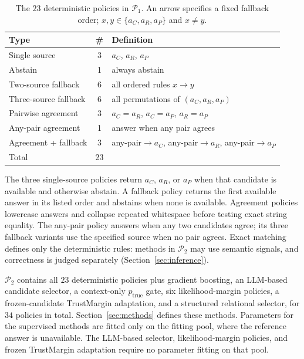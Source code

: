 \documentclass[sigconf]{acmart}
\newcommand{\ac}{a_C}
\newcommand{\ar}{a_R}
\newcommand{\ap}{a_P}
\begin{document}
\begin{table}[t]
\centering
\footnotesize
\caption{The $23$ deterministic policies in $\mathcal{P}_1$.
An arrow specifies a fixed fallback order; $x,y\in
\{\ac,\ar,\ap\}$ and $x\neq y$.}
\label{tab:det-policies}
\begin{tabularx}{\columnwidth}{@{}l c X@{}}
\toprule
Type & \# & Definition \\
\midrule
Single source
& 3 & $\ac$, $\ar$, $\ap$ \\

Abstain
& 1 & always abstain \\

Two-source fallback
& 6 & all ordered rules $x\!\to\!y$ \\

Three-source fallback
& 6 & all permutations of $(\ac,\ar,\ap)$ \\

Pairwise agreement
& 3 & $\ac=\ar$, $\ac=\ap$, $\ar=\ap$ \\

Any-pair agreement
& 1 & answer when any pair agrees \\

Agreement + fallback
& 3 & any-pair$\!\to\!\ac$,
      any-pair$\!\to\!\ar$,
      any-pair$\!\to\!\ap$ \\
\midrule
Total & 23 & \\
\bottomrule
\end{tabularx}
\end{table}

The three single-source policies return $\ac$, $\ar$, or $\ap$ when
that candidate is available and otherwise abstain. A fallback policy
returns the first available answer in its listed order and abstains
when none is available. Agreement policies lowercase
answers and collapse repeated whitespace before testing exact string
equality. The any-pair policy answers when any two candidates agree;
its three fallback variants use the specified source when no pair
agrees. Exact matching defines only the deterministic rules: methods in
$\mathcal{P}_2$ may use semantic signals, and correctness is judged
separately (Section~\ref{sec:inference}).

$\mathcal{P}_2$ contains all $23$ deterministic policies plus gradient
boosting, an LLM-based candidate selector, a context-only
$p_{\mathrm{true}}$ gate, six likelihood-margin policies, a frozen-candidate
TrustMargin adaptation, and a structured relational selector, for $34$
policies in total. Section~\ref{sec:methods} defines these methods. Parameters for
the supervised methods are fitted only on the fitting pool, where the
reference answer is unavailable. The LLM-based selector,
likelihood-margin policies, and frozen TrustMargin adaptation require no
parameter fitting on that pool.
\end{document}
